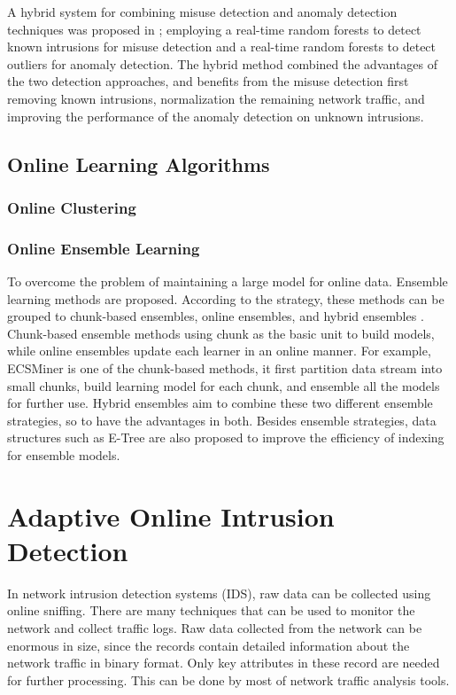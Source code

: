 \documentclass[runningheads]{llncs}
\begin{document}
	A hybrid system for combining misuse detection and anomaly detection techniques was proposed in \cite{Zhang2006}; employing a real-time random forests to detect known intrusions for misuse detection and a real-time random forests to detect outliers for anomaly detection. The hybrid method combined the advantages of the two detection approaches, and benefits from the misuse detection first removing known intrusions, normalization the remaining network traffic, and improving the performance of the anomaly detection on unknown intrusions.
	
	\subsection{Online Learning Algorithms}
	
	\subsubsection{Online Clustering}
	
	\subsubsection{Online Ensemble Learning}
	
	To overcome the problem of maintaining a large model for online data. Ensemble learning methods are proposed. According to the strategy, these methods can be grouped to chunk-based ensembles, online ensembles, and hybrid ensembles \cite{Sun2016}. Chunk-based ensemble methods using chunk as the basic unit to build models, while online ensembles update each learner in an online manner. For example, ECSMiner\cite{Masud2011} is one of the chunk-based methods, it first partition data stream into small chunks, build learning model for each chunk, and ensemble all the models for further use. Hybrid ensembles aim to combine these two different ensemble strategies, so to have the advantages in both. Besides ensemble strategies, data structures such as E-Tree \cite{Zhang2015} are also proposed to improve the efficiency of indexing for ensemble models. 

	\section{Adaptive Online Intrusion Detection} \label{Our Method}
	
	In network intrusion detection systems (IDS), raw data can be collected using online sniffing. There are many techniques that can be used to monitor the network and collect traffic logs. Raw data collected from the network can be enormous in size, since the records contain detailed information about the network traffic in binary format. Only key attributes in these record are needed for further processing. This can be done by most of network traffic analysis tools.
\end{document}
